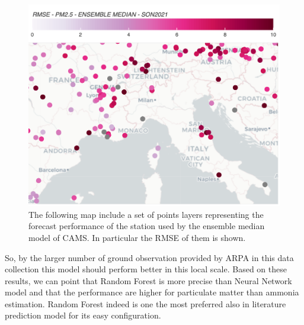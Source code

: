 \begin{figure}[H]
    \centering
    \includegraphics[scale=0.2]{src/images/cams_obs.png}
    \caption{The following map include a set of points layers representing the forecast performance of the station used by the ensemble median model of CAMS. In particular the RMSE of them is shown\cite{camsobs}. 
}
    \label{fig:cams}
\end{figure}

So, by the larger number of ground observation provided by ARPA in this data collection this model should perform better in this local scale.
\bigbreak
Based on these results, we can point that Random Forest is more precise than Neural Network model and that the performance are higher for particulate matter than ammonia estimation.
Random Forest indeed is one the most preferred also in literature prediction model for its easy configuration.
